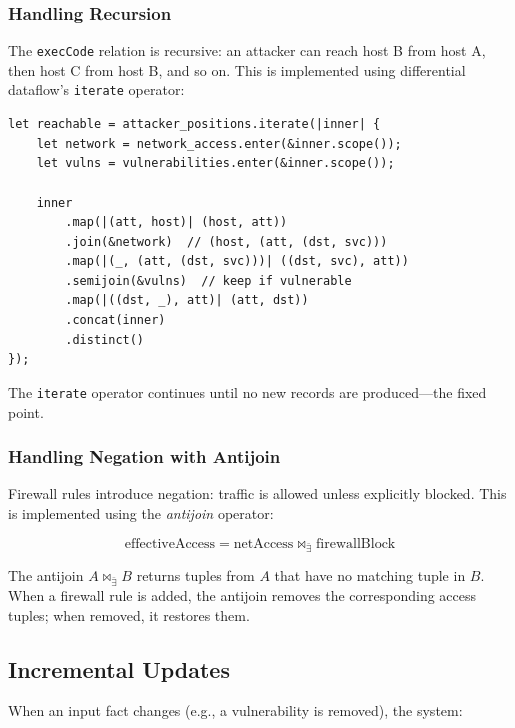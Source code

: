 \documentclass[conference]{IEEEtran}
\begin{document}
\subsubsection{Handling Recursion}

The \texttt{execCode} relation is recursive: an attacker can reach host B from host A, then host C from host B, and so on. This is implemented using differential dataflow's \texttt{iterate} operator:

\begin{lstlisting}[style=rust, caption={Recursive reachability in differential dataflow}]
let reachable = attacker_positions.iterate(|inner| {
    let network = network_access.enter(&inner.scope());
    let vulns = vulnerabilities.enter(&inner.scope());
    
    inner
        .map(|(att, host)| (host, att))
        .join(&network)  // (host, (att, (dst, svc)))
        .map(|(_, (att, (dst, svc)))| ((dst, svc), att))
        .semijoin(&vulns)  // keep if vulnerable
        .map(|((dst, _), att)| (att, dst))
        .concat(inner)
        .distinct()
});
\end{lstlisting}

The \texttt{iterate} operator continues until no new records are produced---the fixed point.

\subsubsection{Handling Negation with Antijoin}

Firewall rules introduce negation: traffic is allowed unless explicitly blocked. This is implemented using the \textit{antijoin} operator:

\begin{equation}
\text{effectiveAccess} = \text{netAccess} \bowtie_{\bar{\exists}} \text{firewallBlock}
\end{equation}

The antijoin $A \bowtie_{\bar{\exists}} B$ returns tuples from $A$ that have no matching tuple in $B$. When a firewall rule is added, the antijoin removes the corresponding access tuples; when removed, it restores them.

\subsection{Incremental Updates}

When an input fact changes (e.g., a vulnerability is removed), the system:
\end{document}
